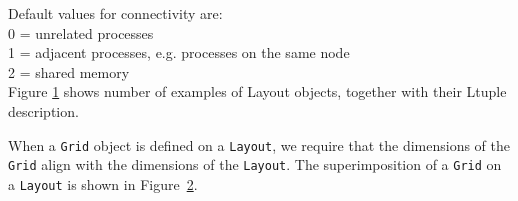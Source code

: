 Default values for connectivity are: \\
0 = unrelated processes \\
1 = adjacent processes, e.g. processes on the same node\\
2 = shared memory \\

Figure \ref{fig:layouts} shows number of examples of Layout objects,
together with their Ltuple description.

\begin{figure}

\label{fig:layouts}
\end{figure}

When a {\tt Grid} object is defined on a {\tt Layout}, we require that the dimensions 
of the {\tt Grid} align with the dimensions of the {\tt Layout}.  The superimposition
of a {\tt Grid} on a {\tt Layout} is shown in Figure~\ref{fig:gridlayout}.

\begin{figure}
\label{fig:gridlayout}
\end{figure}

